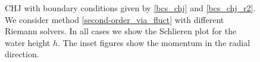 \documentclass[preprint, 11pt]{article}
\begin{document}
\begin{figure}[!h]
  \vspace{10pt}
  \caption{CHJ with boundary conditions given by \eqref{bcs_chj} and \eqref{bcs_chj_r2}. 
    We consider method \eqref{second-order_via_fluct} with different Riemann solvers.
    In all cases we show the Schlieren plot for the water height $h$.
    The inset figures show the momentum in the radial direction.}
\end{figure}
\end{document}
